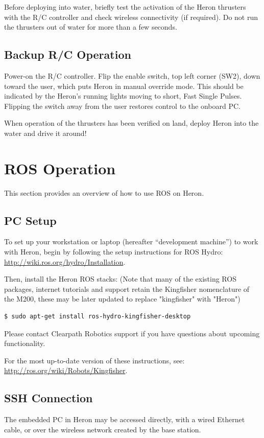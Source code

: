 \documentclass[]{clearpath-latex/clearpath-manual}
\begin{document}
Before deploying into water, briefly test the activation of the Heron thrusters with the R/C controller and check wireless connectivity (if required). Do not run the thrusters out of water for more than a few seconds.

\subsection{Backup R/C Operation} \label{backupoperation}
Power-on the R/C controller. Flip the enable switch, top left corner (SW2), down toward the user, which puts Heron in manual override mode. This should be indicated by the Heron's running lights moving to short, Fast Single Pulses. Flipping the switch away from the user restores control to the onboard PC.

When operation of the thrusters has been verified on land, deploy Heron into the water and drive it around!

\newpage

\section{ROS Operation}
This section provides an overview of how to use ROS on Heron.

\subsection{PC Setup} \label{pcsetup}

To set up your workstation or laptop (hereafter “development machine”) to work with Heron, begin by following the setup instructions for ROS Hydro: \url{http://wiki.ros.org/hydro/Installation}.

Then, install the Heron ROS stacks:
(Note that many of the existing ROS packages, internet tutorials and support retain the Kingfisher nomenclature of the M200, these may be later updated to replace "kingfisher" with "Heron")

\begin{lstlisting} 
$ sudo apt-get install ros-hydro-kingfisher-desktop
\end{lstlisting}

 Please contact Clearpath Robotics support if you have questions about upcoming functionality.

For the most up-to-date version of these instructions, see: \url{http://ros.org/wiki/Robots/Kingfisher}.

\subsection{SSH Connection}
The embedded PC in Heron may be accessed directly, with a wired Ethernet cable, or over the wireless network created by the base station.
\end{document}

